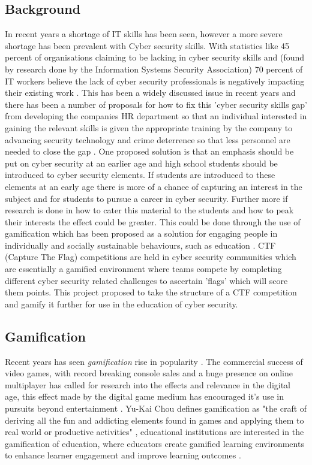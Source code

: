 \documentclass[12pt,a4paper]{article}
\begin{document}
\subsection{Background}  
In recent years a shortage of IT skills has been seen, however a more severe shortage has been prevalent with Cyber security skills. With statistics like 45 percent of organisations claiming to be lacking in cyber security skills and (found by research done by the Information Systems Security Association) 70 percent of IT workers believe the lack of cyber security professionals is negatively impacting their existing work \cite{smith2018intelligent}. This has been a widely discussed issue in recent years and there has been a number of proposals for how to fix this 'cyber security skills gap' from developing the companies HR department so that an individual interested in gaining the relevant skills is given the appropriate training by the company to advancing security technology and crime deterrence so that less personnel are needed to close the gap \cite{cobb2016mind}. One proposed solution is that an emphasis should be put on cyber security at an earlier age and high school students should be introduced to cyber security elements. If students are introduced to these elements at an early age there is more of a chance of capturing an interest in the subject and for students to pursue a career in cyber security. Further more if research is done in how to cater this material to the students and how to peak their interests the effect could be greater. This could be done through the use of gamification which has been proposed as a solution for engaging people in individually and socially sustainable behaviours, such as education \cite{su2015mobile}. CTF (Capture The Flag) competitions are held in cyber security communities which are essentially a gamified environment where teams compete by completing different cyber security related challenges to ascertain 'flags' which will score them points. This project proposed to take the structure of a CTF competition and gamify it further for use in the education of cyber security.   

\subsection{Gamification}

Recent years has seen \emph{gamification} rise in popularity \cite{deterding2011game}. The commercial success of video games, with record breaking console sales and a huge presence on online multiplayer has called for research into the effects and relevance in the digital age, this effect made by the digital game medium has encouraged it's use in pursuits beyond entertainment \cite{seaborn2015gamification}. Yu-Kai Chou defines gamification as "the craft of deriving all the fun and addicting elements found in games and applying them to real world or productive activities" \cite{huang2013gamification}, educational institutions are interested in the gamification of education, where educators create gamified learning environments to enhance learner engagement and improve learning outcomes \cite{nah2014gamification}. 
\end{document}
